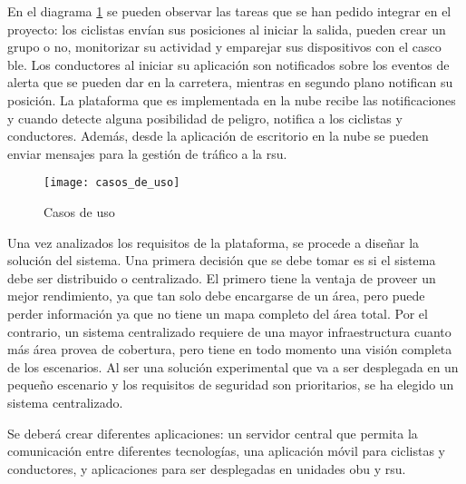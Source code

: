 En el diagrama \ref{fig:casos_de_uso} se pueden observar las tareas que se han pedido integrar en el proyecto: los ciclistas envían sus posiciones al iniciar la salida, pueden crear un grupo o no, monitorizar su actividad y emparejar sus dispositivos con el casco \gls{ble}. Los conductores al iniciar su aplicación son notificados sobre los eventos de alerta que se pueden dar en la carretera, mientras en segundo plano notifican su posición. La plataforma que es implementada en la nube recibe las notificaciones y cuando detecte alguna posibilidad de peligro, notifica a los ciclistas y conductores. Además, desde la aplicación de escritorio en la nube se pueden enviar mensajes para la gestión de tráfico a la \gls{rsu}.
\begin{figure}[H]
	\begin{center}
		\texttt{[image: casos\_de\_uso]}
		\caption{Casos de uso}
		\label{fig:casos_de_uso}
	\end{center}
\end{figure}

Una vez analizados los requisitos de la plataforma, se procede a diseñar la solución del sistema. Una primera decisión que se debe tomar es si el sistema debe ser distribuido o centralizado. El primero tiene la ventaja de proveer un mejor rendimiento, ya que tan solo debe encargarse de un área, pero puede perder información ya que no tiene un mapa completo del área total. Por el contrario, un sistema centralizado requiere de una mayor infraestructura cuanto más área provea de cobertura, pero tiene en todo momento una visión completa
de los escenarios. Al ser una solución experimental que va a ser desplegada en un pequeño escenario y los requisitos de seguridad son prioritarios, se ha elegido un sistema centralizado.

Se deberá crear diferentes aplicaciones: un servidor central que permita la comunicación entre diferentes tecnologías, una aplicación móvil para ciclistas y conductores, y aplicaciones para ser desplegadas en unidades \gls{obu} y \gls{rsu}.





